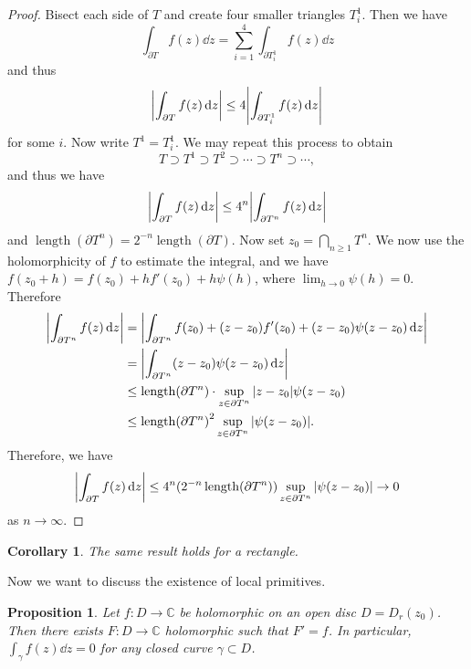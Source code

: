 \documentclass[leqno, openany]{memoir}
\newtheorem{cor}[thm]{Corollary}
\newtheorem{prop}[thm]{Proposition}
\theoremstyle{definition}
\theoremstyle{remark}
\theoremstyle{plain}
\theoremstyle{definition}
\theoremstyle{remark}
\newcommand{\C}{\mathbb{C}}
\DeclareMathOperator{\len}{length}
\begin{document}
\begin{proof}
    Bisect each side of $T$ and create four smaller triangles $T_i^1$. Then we have
    \[ \int_{\partial T} f(z) \dd{z} = \sum_{i=1}^4 \int_{\partial T_i^1} f(z) \dd{z} \]
    and thus 
    \[ \abs{\int_{\partial T} f(z) \dd{z}} \leq 4 \abs{\int_{\partial T_i^1} f(z) \dd{z}} \]
    for some $i$. Now write $T^1 = T_i^1$. We may repeat this process to obtain
    \[ T \supset T^1 \supset T^2 \supset \cdots \supset T^n \supset \cdots, \]
    and thus we have
    \[ \abs{\int_{\partial T} f(z) \dd{z}} \leq 4^n \abs{\int_{\partial T^n} f(z) \dd{z}} \]
    and $\len(\partial T^n) = 2^{-n} \len(\partial T)$. Now set $z_0 = \bigcap_{n \geq 1} T^n$. We now use the holomorphicity of $f$ to estimate the integral, and we have $f(z_0 + h) = f(z_0) + hf'(z_0) + h \psi(h)$, where $\lim_{h \to 0} \psi(h) = 0$. Therefore
    \begin{align*}
        \abs{\int_{\partial T^n} f(z) \dd{z}} &= \abs{\int_{\partial T^n} f(z_0) + (z-z_0)f'(z_0) + (z-z_0) \psi(z-z_0) \dd{z}} \\
                                              &= \abs{\int_{\partial T^n} (z-z_0) \psi(z-z_0) \dd{z}} \\
                                              &\leq \len(\partial T^n) \cdot \sup_{z \in \partial T^n} \abs{z-z_0}{\psi(z-z_0)} \\
                                              &\leq {\len(\partial T^n)}^2 \sup_{z \in \partial T^n} \abs{\psi(z-z_0)}.
    \end{align*}
    Therefore, we have
    \[ \abs{\int_{\partial T} f(z) \dd{z}} \leq 4^n {(2^{-n} \len(\partial T^n))} \sup_{z \in \partial T^n} \abs{\psi(z-z_0)} \to 0 \]
    as $n \to \infty$.
\end{proof}

\begin{cor}
    The same result holds for a rectangle.
\end{cor}

Now we want to discuss the existence of local primitives.

\begin{prop}
    Let $f \colon D \to \C$ be holomorphic on an open disc $D = D_r(z_0)$. Then there exists $F \colon D \to \C$ holomorphic such that $F' = f$. In particular, $\int_{\gamma} f(z) \dd{z} = 0$ for any closed curve $\gamma \subset D$.
\end{prop}
\end{document}
